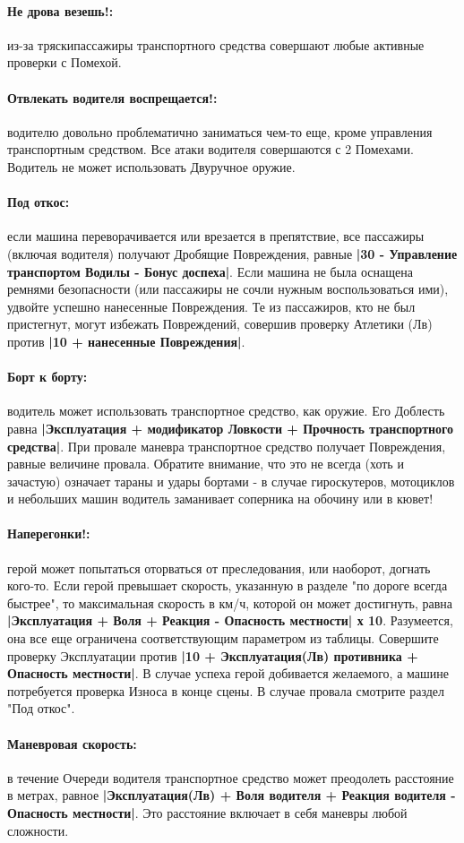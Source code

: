 \paragraph{Не дрова везешь!:} из-за тряскипассажиры транспортного средства совершают любые активные проверки с Помехой.
\paragraph{Отвлекать водителя воспрещается!:} водителю довольно проблематично заниматься чем-то еще, кроме управления транспортным средством. Все атаки водителя совершаются с 2 Помехами. Водитель не может использовать Двуручное оружие.
\paragraph{Под откос:} если машина переворачивается или врезается в препятствие, все пассажиры (включая водителя) получают Дробящие Повреждения, равные \textbf{|30 - Управление транспортом Водилы - Бонус доспеха|}. Если машина не была оснащена ремнями безопасности (или пассажиры не сочли нужным воспользоваться ими), удвойте успешно нанесенные Повреждения.
\newline
Те из пассажиров, кто не был пристегнут, могут избежать Повреждений, совершив проверку Атлетики (Лв) против \textbf{|10 + нанесенные Повреждения|}.
\paragraph{Борт к борту:} водитель может использовать транспортное средство, как оружие. Его Доблесть равна \textbf{|Эксплуатация + модификатор Ловкости + Прочность транспортного средства|}. При провале маневра транспортное средство получает Повреждения, равные величине провала. Обратите внимание, что это не всегда (хоть и зачастую) означает тараны и удары бортами - в случае гироскутеров, мотоциклов и небольших машин водитель заманивает соперника на обочину или в кювет!
\paragraph{Наперегонки!:} герой может попытаться оторваться от преследования, или наоборот, догнать кого-то. Если герой превышает скорость, указанную в разделе "по дороге всегда быстрее", то максимальная скорость в км/ч, которой он может достигнуть, равна \textbf{|Эксплуатация + Воля + Реакция - Опасность местности| х 10}. Разумеется, она все еще ограничена соответствующим параметром из таблицы. Совершите проверку Эксплуатации против \textbf{|10 + Эксплуатация(Лв) противника + Опасность местности|}. В случае успеха герой добивается желаемого, а машине потребуется проверка Износа в конце сцены. В случае провала смотрите раздел "Под откос".
\paragraph{Маневровая скорость:} в течение Очереди водителя транспортное средство может преодолеть расстояние в метрах, равное \textbf{|Эксплуатация(Лв) + Воля водителя + Реакция водителя - Опасность местности|}. Это расстояние включает в себя маневры любой сложности.
